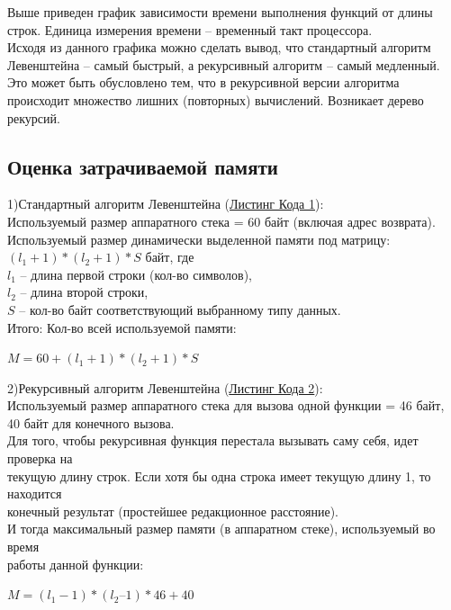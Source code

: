 \documentclass[a4paper,12pt]{article}
\begin{document}
Выше приведен график зависимости времени выполнения функций от длины строк. Единица измерения времени – временный такт процессора. \\

Исходя из данного графика можно сделать вывод, что стандартный алгоритм Левенштейна – самый быстрый, а рекурсивный алгоритм – самый медленный. Это может быть обусловлено тем, что в рекурсивной версии алгоритма происходит множество лишних (повторных) вычислений. Возникает дерево рекурсий. \\

\newpage
\subsection{Оценка затрачиваемой памяти}
1)Стандартный алгоритм Левенштейна (\hyperref[listings:listing1]{Листинг Кода 1}): \\
Используемый размер аппаратного стека = 60 байт (включая адрес возврата). \\
Используемый размер динамически выделенной памяти под матрицу: \\
$(l_1 + 1) * (l_2 + 1) * S$ байт, где \\
$l_1$ – длина первой строки (кол-во символов), \\
$l_2$ – длина второй строки, \\
$S$ – кол-во байт соответствующий выбранному типу данных. \\
Итого: Кол-во всей используемой памяти:
\begin{center}
$M = 60 + (l_1 + 1) * (l_2 + 1) * S$
\end{center}
2)Рекурсивный алгоритм Левенштейна (\hyperref[listings:listing2]{Листинг Кода 2}): \\
Используемый размер аппаратного стека для вызова одной функции = 46 байт, \\
40 байт для конечного вызова. \\
Для того, чтобы рекурсивная функция перестала вызывать саму себя, идет проверка на \\
текущую длину строк. Если хотя бы одна строка имеет текущую длину 1, то находится \\
конечный результат (простейшее редакционное расстояние). \\
И тогда максимальный размер памяти (в аппаратном стеке), используемый во время \\
работы данной функции:\\
\begin{center}
$M = (l_1 - 1) * (l_2 – 1) * 46 + 40$
\end{center}
\end{document}

